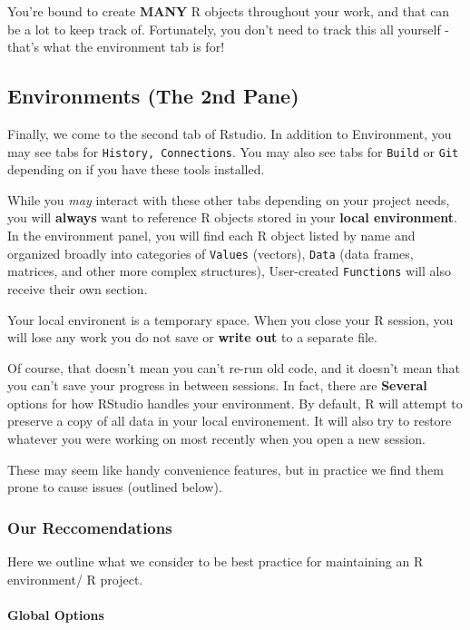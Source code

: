 \documentclass[
]{book}
\begin{document}
You're bound to create \textbf{MANY} R objects throughout your work, and that can be a lot to keep track of. Fortunately, you don't need to track this all yourself - that's what the environment tab is for!

\hypertarget{environments-the-2nd-pane}{%
\subsection{Environments (The 2nd Pane)}\label{environments-the-2nd-pane}}

Finally, we come to the second tab of Rstudio. In addition to Environment, you may see tabs for \texttt{History,\ Connections}. You may also see tabs for \texttt{Build} or \texttt{Git} depending on if you have these tools installed.

While you \emph{may} interact with these other tabs depending on your project needs, you will \textbf{always} want to reference R objects stored in your \textbf{local environment}. In the environment panel, you will find each R object listed by name and organized broadly into categories of \texttt{Values} (vectors), \texttt{Data} (data frames, matrices, and other more complex structures), User-created \texttt{Functions} will also receive their own section.

Your local environent is a temporary space. When you close your R session, you will lose any work you do not save or \textbf{write out} to a separate file.

Of course, that doesn't mean you can't re-run old code, and it doesn't mean that you can't save your progress in between sessions. In fact, there are \textbf{Several} options for how RStudio handles your environment. By default, R will attempt to preserve a copy of all data in your local environement. It will also try to restore whatever you were working on most recently when you open a new session.

These may seem like handy convenience features, but in practice we find them prone to cause issues (outlined below).

\hypertarget{our-reccomendations}{%
\subsubsection{Our Reccomendations}\label{our-reccomendations}}

Here we outline what we consider to be best practice for maintaining an R environment/ R project.

\hypertarget{global-options}{%
\paragraph{Global Options}\label{global-options}}
\end{document}
